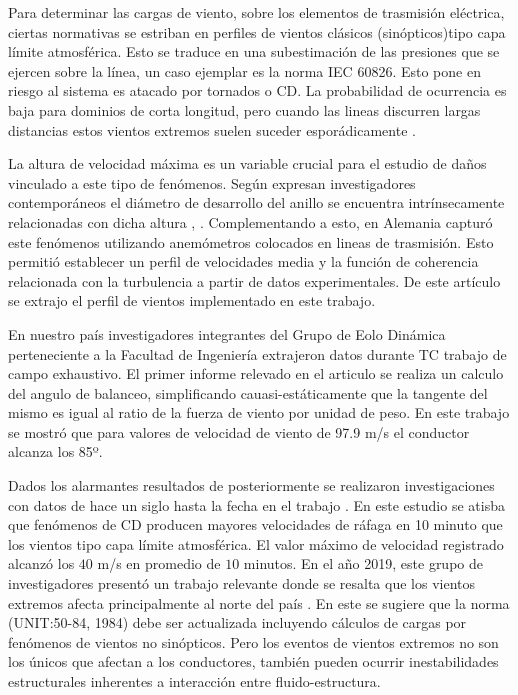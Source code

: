 Para determinar las cargas de viento, sobre los elementos de trasmisión eléctrica, ciertas normativas se estriban en perfiles de vientos clásicos (sinópticos)tipo capa límite atmosférica. Esto se traduce en una subestimación de las presiones que se ejercen sobre la línea, un caso ejemplar es la norma \gls{IEC} 60826. Esto pone en riesgo al sistema es atacado por tornados o CD. La probabilidad de ocurrencia es baja para dominios de corta longitud, pero cuando las lineas discurren largas distancias estos vientos extremos suelen suceder esporádicamente \textcite{ang1984probability}. 

La altura de velocidad máxima es un variable crucial para el estudio de daños vinculado a este tipo de fenómenos. Según expresan investigadores contemporáneos el diámetro de desarrollo del anillo se encuentra intrínsecamente relacionadas con dicha altura  \textcite{holmes2002re}, \cite{abd2013coupled}. Complementando a esto, \textcite{stengel2017measurements} en Alemania capturó este fenómenos utilizando anemómetros colocados en lineas de trasmisión. Esto permitió establecer un perfil de velocidades media y la función de coherencia relacionada con la turbulencia a partir de datos experimentales. De este artículo se extrajo el perfil de vientos implementado en este trabajo.

En nuestro país investigadores integrantes del Grupo de Eolo Dinámica perteneciente a la Facultad de Ingeniería extrajeron datos durante TC trabajo de campo exhaustivo. El primer informe relevado en el articulo \cite{duranona2009analysis} se realiza un calculo del angulo de balanceo, simplificando cauasi-estáticamente que la tangente del mismo es igual al ratio de la fuerza de viento por unidad de peso. En este trabajo se mostró que para valores de velocidad de viento de 97.9 m/s el conductor alcanza los 85º.

 Dados los alarmantes resultados de \cite{duranona2009analysis} posteriormente se realizaron investigaciones con datos de hace un siglo  hasta la fecha en el trabajo \citep{duranona2015significance}. En este estudio se atisba que fenómenos de CD producen mayores velocidades de ráfaga en 10 minuto que los vientos tipo capa límite atmosférica. El valor máximo de velocidad registrado alcanzó los $40$ m/s en promedio de $10$ minutos. En el año 2019, este grupo de investigadores presentó un trabajo relevante donde se resalta que los vientos extremos afecta principalmente al norte del país \textcite{duranona2019first}. En este se sugiere que la norma (\gls{UNIT}:50-84, 1984) debe ser actualizada incluyendo cálculos de cargas por fenómenos de vientos no sinópticos. Pero los eventos de vientos extremos no son los únicos que afectan a los conductores, también pueden ocurrir inestabilidades estructurales inherentes a interacción entre fluido-estructura. 

